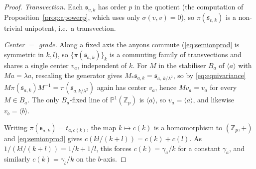 \documentclass[aps,twocolumn,prx,floatfix,preprintnumbers, nofootinbib,10pt]{revtex4-2}
\numberwithin{equation}{section}
\theoremstyle{definition}
\theoremstyle{remark}
\theoremstyle{claim}
\newcommand{\Z}{{\mathbb Z}}
\begin{document}
\begin{proof}
\emph{Transvection.}  Each $\mathfrak{s}_{v,k}$ has order $p$ in the quotient
(the computation of Proposition~\ref{prop:apowerp}, which uses only
$\sigma(v,v)=0$), so $\pi(\mathfrak{s}_{v,k})$ is a non-trivial unipotent, i.e.\
a transvection.

\emph{Center $=$ grade.}  Along a fixed axis the anyons commute (\eqref{eq:semionprod} is symmetric in $k,l$), so $\{\pi(\mathfrak{s}_{a,k})\}_k$
is a commuting family of transvections and shares a single center $v_a$,
independent of $k$.  For $M$ in the stabiliser $B_a$ of $\langle a\rangle$ with
$Ma=\lambda a$, rescaling the  generator gives
$M_*\mathfrak{s}_{a,k}=\mathfrak{s}_{a,\,k/\lambda^2}$, so by
\eqref{eq:equivariance} $M\pi(\mathfrak{s}_{a,k})M^{-1}=\pi(\mathfrak{s}_{a,k/\lambda^2})$
again has center $v_a$, hence $Mv_a=v_a$ for every $M\in B_a$.  The only
$B_a$-fixed line of $\mathbb P^1(\Z_p)$ is $\langle a\rangle$, so
$v_a=\langle a\rangle$, and likewise $v_b=\langle b\rangle$.

Writing $\pi(\mathfrak{s}_{a,k})=t_{a,c(k)}$, the map
$k\mapsto c(k)$ is a homomorphism to $(\Z_p,+)$ and \eqref{eq:semionprod}
gives $c(kl/(k+l))=c(k)+c(l)$.  As $1/(kl/(k+l))=1/k+1/l$, this forces
$c(k)=\gamma_a/k$ for a constant $\gamma_a$, and similarly $c(k)=\gamma_b/k$ on
the $b$-axis.


\end{proof}
\end{document}
